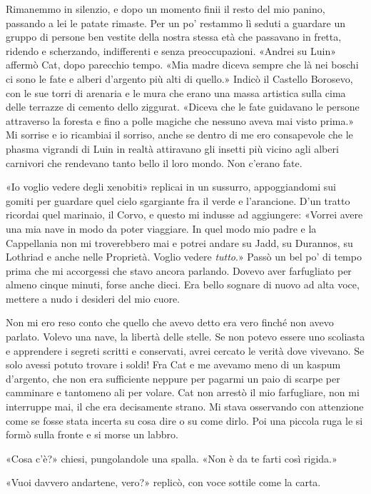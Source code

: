 Rimanemmo in silenzio, e dopo un momento finii il resto del mio panino,
passando a lei le patate rimaste. Per un po' restammo lì seduti a
guardare un gruppo di persone ben vestite della nostra stessa età che
passavano in fretta, ridendo e scherzando, indifferenti e senza
preoccupazioni. «Andrei su Luin» affermò Cat, dopo parecchio tempo. «Mia
madre diceva sempre che là nei boschi ci sono le fate e alberi d'argento
più alti di quello.» Indicò il Castello Borosevo, con le sue torri di
arenaria e le mura che erano una massa artistica sulla cima delle
terrazze di cemento dello ziggurat. «Diceva che le fate guidavano le
persone attraverso la foresta e fino a polle magiche che nessuno aveva
mai visto prima.» Mi sorrise e io ricambiai il sorriso, anche se dentro
di me ero consapevole che le phasma vigrandi di Luin in realtà
attiravano gli insetti più vicino agli alberi carnivori che rendevano
tanto bello il loro mondo. Non c'erano fate.

«Io voglio vedere degli xenobiti» replicai in un sussurro, appoggiandomi
sui gomiti per guardare quel cielo sgargiante fra il verde e
l'arancione. D'un tratto ricordai quel marinaio, il Corvo, e questo mi
indusse ad aggiungere: «Vorrei avere una mia nave in modo da poter
viaggiare. In quel modo mio padre e la Cappellania non mi troverebbero
mai e potrei andare su Jadd, su Durannos, su Lothriad e anche nelle
Proprietà. Voglio vedere \emph{tutto}.» Passò un bel po' di tempo prima
che mi accorgessi che stavo ancora parlando. Dovevo aver farfugliato per
almeno cinque minuti, forse anche dieci. Era bello sognare di nuovo ad
alta voce, mettere a nudo i desideri del mio cuore.

Non mi ero reso conto che quello che avevo detto era vero finché non
avevo parlato. Volevo una nave, la libertà delle stelle. Se non potevo
essere uno scoliasta e apprendere i segreti scritti e conservati, avrei
cercato le verità dove vivevano. Se solo avessi potuto trovare i soldi!
Fra Cat e me avevamo meno di un kaspum d'argento, che non era
sufficiente neppure per pagarmi un paio di scarpe per camminare e
tantomeno ali per volare. Cat non arrestò il mio farfugliare, non mi
interruppe mai, il che era decisamente strano. Mi stava osservando con
attenzione come se fosse stata incerta su cosa dire o su come dirlo. Poi
una piccola ruga le si formò sulla fronte e si morse un labbro.

«Cosa c'è?» chiesi, pungolandole una spalla. «Non è da te farti così
rigida.»

«Vuoi davvero andartene, vero?» replicò, con voce sottile come la carta.

